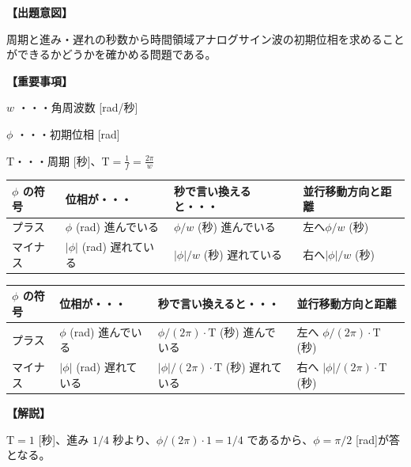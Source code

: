 \noindent \textbf{【出題意図】}

\noindent 周期と進み・遅れの秒数から時間領域アナログサイン波の初期位相を求めることができるかどうかを確かめる問題である。

\vspace{1em}
\noindent \textbf{【重要事項】}

\bigskip
\noindent $w$ ・・・角周波数 [rad/秒]

\bigskip
\noindent $\phi$ ・・・初期位相 [rad]

\bigskip
$\textrm{T}$・・・周期 [秒]、$\textrm{T} = \frac{1}{f} = \frac{2\pi}{w}$

\begin{center}
\begin{tabularx}{0.9\fbwidth}{|X|X|X|X|}
\hline
$\phi$ の符号&  位相が・・・   & 秒で言い換えると・・・   & 並行移動方向と距離 \\
\hline
プラス &  $\phi$ (rad) 進んでいる & $\phi/w$ (秒) 進んでいる & 左へ$\phi/w$ (秒) \\
\hline
マイナス &  $|\phi|$ (rad) 遅れている & $|\phi|/w$ (秒) 遅れている & 右へ$|\phi|/w$ (秒) \\
\hline
\end{tabularx}

\medskip
\begin{tabularx}{0.9\fbwidth}{|X|X|X|X|}
\hline
$\phi$ の符号&  位相が・・・   & 秒で言い換えると・・・   & 並行移動方向と距離 \\
\hline
プラス &  $\phi$ (rad) 進んでいる & $\phi/(2\pi) \cdot \textrm{T}$ (秒) 進んでいる & 左へ $\phi/(2\pi) \cdot \textrm{T}$ (秒) \\
\hline
マイナス &  $|\phi|$ (rad) 遅れている & $|\phi|/(2\pi) \cdot \textrm{T}$ (秒) 遅れている & 右へ $|\phi|/(2\pi) \cdot \textrm{T}$ (秒) \\
\hline
\end{tabularx}
\end{center}

\vspace{1em}
\noindent \textbf{【解説】}

\noindent $\textrm{T} = 1$ [秒]、進み $1/4$ 秒より、$\phi/(2\pi) \cdot 1 = 1/4$ であるから、$\phi = \pi/2$ [rad]が答となる。


